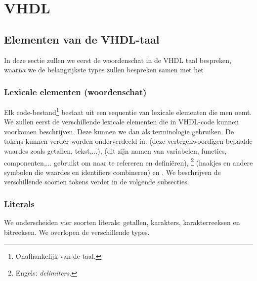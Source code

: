 \chapter{VHDL}
\section{Elementen van de VHDL-taal}
In deze sectie zullen we eerst de woordenschat in de VHDL taal bespreken, waarna we de belangrijkste types zullen bespreken samen met het 
\subsection{Lexicale elementen (woordenschat)}
Elk code-bestand\footnote{Onafhankelijk van de taal.} bestaat uit een sequentie van lexicale elementen die men  oemt. We zullen eerst de verschillende lexicale elementen die in VHDL-code kunnen voorkomen beschrijven. Deze kunnen we dan als terminologie gebruiken. De tokens kunnen verder worden onderverdeeld in:  (deze vertegenwoordigen bepaalde waardes zoals getallen, tekst,...),  (dit zijn namen van variabelen, functies, componenten,... gebruikt om naar te refereren en defini\"eren), \footnote{Engels: \emph{delimiters}.} (haakjes en andere symbolen die waardes en identifiers combineren) en . We beschrijven de verschillende soorten tokens verder in de volgende subsecties.
\subsection{Literals}
We onderscheiden vier soorten literals: getallen, karakters, karakterreeksen en bitreeksen. We overlopen de verschillende types.
